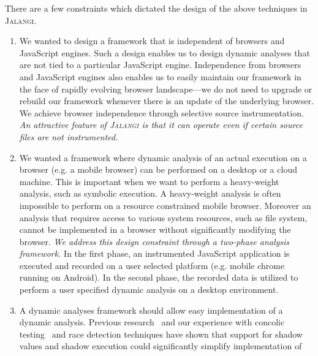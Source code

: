 \documentclass{sig-alternate}
\def\jalangi{\textsc{Jalangi}}
\begin{document}
There are a few constraints which dictated the design of the above
techniques in \jalangi{}.

\begin{enumerate}
\item We wanted to design a framework that is independent of browsers
  and JavaScript engines.  Such a design enables us to design dynamic
  analyses that are not tied to a particular JavaScript engine.
  Independence from browsers and JavaScript engines also enables us to
  easily maintain our framework in the face of rapidly evolving
  browser landscape---we do not need to upgrade or rebuild our
  framework whenever there is an update of the underlying browser.  We
  achieve browser independence through selective source
  instrumentation.  %
  \emph{An attractive feature of \jalangi{} is that it can operate
    even if certain source files are not instrumented.}
\item We wanted a framework where dynamic analysis of an actual
  execution on a browser (e.g. a mobile browser) can be performed on a
  desktop or a cloud machine.  This is important when we want to
  perform a heavy-weight analysis, such as symbolic execution.  A
  heavy-weight analysis is often impossible to perform on a resource
  constrained mobile browser.  Moreover an analysis that requires
  access to various system resources, such as file system, cannot be
  implemented in a browser without significantly modifying the
  browser. \emph{We address this design constraint through a two-phase
    analysis framework.}  In the first phase, an instrumented
  JavaScript application is executed and recorded on a user selected platform
  (e.g. mobile chrome running on Android).  %
  In the second phase, the recorded data is utilized to perform a user
  specified dynamic analysis on a desktop environment.
\item A dynamic analyses framework should allow easy implementation of
  a dynamic analysis.  Previous
  research~\cite{Seward:2005:UVD:1247360.1247362,Nethercote:2007:VFH:1250734.1250746,hobbs,Bond:2007:TBA:1297027.1297057,songndss05}
  and our experience with concolic testing~\cite{dart,cute} and race
  detection techniques have shown that support for shadow values and
  shadow execution could significantly simplify implementation of

\end{enumerate}
\end{document}
